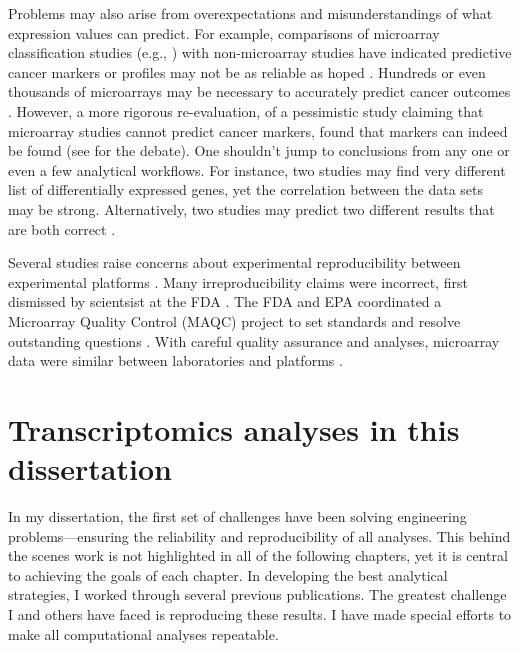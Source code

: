 Problems may also arise from overexpectations and misunderstandings 
of what expression values can predict. 
For example, comparisons of microarray classification
studies (e.g., \cite{Veer:2002vv,Yeoh:2002wg,Alizadeh:2000tn,Golub:1999fn,
Perou:1999fr,Wang:2005uu,VanDeVijver:2002wj,Rosenwald:2002eg,Beer:2002uy,
Bhattacharjee:2001dt,Ramaswamy:2003to,Pomeroy:2002wx,Iizuka:2003wo})
with non-microarray studies have indicated predictive cancer markers or profiles
may not be as reliable as hoped \cite{Miklos:2004wn,Michiels:2007vs,Koscielny:2010gg,Eden:2004ua}.
Hundreds or even thousands of microarrays may be necessary to
accurately predict cancer 
outcomes \cite{Ioannidis:2005kd,Michiels:2005tg,EinDor:2006ga,Frantz:2005ur}.
However, a more rigorous re-evaluation, of a pessimistic study claiming
that microarray studies cannot predict cancer markers, found that
markers can indeed be found (see \cite{Michiels:2005tg,Fan:2010cv,Tong:2010ka,Koscielny:2010jd}
for the debate).
One shouldn't jump to conclusions from any one or even a few
analytical workflows.
For instance, two studies may find very different
list of differentially expressed genes, yet the correlation
between the data sets may be strong. Alternatively, two studies may
predict two different results that are both correct \cite{Zhang:2008bk,Zhang:2009cy}.

Several studies 
raise concerns about experimental reproducibility between
experimental platforms \cite{Tan:2003be,Kuo:2002cl,
Mah:2004ia,Rogojina:2003te,Woo:2004wz,Li:2002cz,Kothapalli:2002gz}.
Many irreproducibility claims were incorrect, first
dismissed by scientsist at the FDA \cite{Shi:2005ik}.
The FDA and EPA coordinated a Microarray Quality Control (MAQC) project
to set standards and resolve outstanding questions 
\cite{Lesko:2004vi,Frueh:2006uy,Dix:2006ty,Shi:2004vh}.
With careful quality assurance and analyses,
microarray data were similar between 
laboratories \cite{Dobbin:2005wj,Irizarry:2005kb,Larkin:2005hb,
Ulrich:2004vw,Waring:2004vh,Weis:2005ut} and
platforms \cite{Petersen:2005by,Yauk:2004fq,
Park:2004ux,Yuen:2002ha,Canales:2006ts,Shippy:2006uf,
Patterson:2006hi,Tong:2006cg,Guo:2006wi}.


\section{Transcriptomics analyses in this dissertation}

In my dissertation, the first set of challenges have
been solving engineering problems---ensuring the reliability
and reproducibility of all analyses. This behind the scenes work is not highlighted
in all of the following chapters, yet it is central
to achieving the goals of each chapter.
In developing the best analytical strategies, I worked
through several previous publications. The greatest challenge
I and others have faced is reproducing these results.
I have made special efforts to make all computational
analyses repeatable. 

